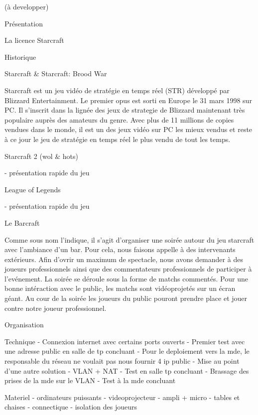       (à developper)

Présentation

    La licence Starcraft

      Historique

        Starcraft & Starcraft: Brood War

          Starcraft est un jeu vidéo de stratégie en temps réel (STR) développé
          par Blizzard Entertainment. Le premier opus est sorti en Europe le 31
          mars 1998 sur PC. Il s'inscrit dans la lignée des jeux de strategie de
          Blizzard maintenant très populaire auprès des amateurs du genre. Avec
          plus de 11 millions de copies vendues dans le monde, il est un des
          jeux vidéo sur PC les mieux vendus et reste à ce jour le jeu de
          stratégie en temps réel le plus vendu de tout les temps.

        Starcraft 2 (wol & hots)

          - présentation rapide du jeu

        League of Legends

          - présentation rapide du jeu

	Le Barcraft

     Comme sous nom l'indique, il s'agit d'organiser une soirée autour
     du jeu starcraft avec l'ambiance d'un bar.	Pour cela, nous faisons
     appelle à des intervenants extérieurs. Afin d'ovrir un maximum de
     spectacle, nous avons demander à des joueurs professionnels ainsi
     que des commentateurs professionnels de participer à l'evénement.
     La soirée se déroule sous la forme de matchs commentés. Pour une
     bonne intéraction avec le public, les matchs sont vidéoprojetés sur
     un écran géant. Au cour de la soirée les joueurs du public pouront
     prendre place et jouer contre notre joueur professionnel.

Organisation

	Technique
		- Connexion internet avec certains ports ouverts
		- Premier test avec une adresse public en salle de tp concluant
		- Pour le deploiement vers la mde, le responsable du réseau ne voulait pas nous fournir 4 ip public
		- Mise au point d'une autre solution
		       - VLAN + NAT
		- Test en salle tp concluant
 		- Brassage des prises de la mde sur le VLAN
		- Test à la mde concluant

	Materiel
		- ordinateurs puissants
		- videoprojecteur
		- ampli + micro
		- tables et chaises
		- connectique
    - isolation des joueurs

